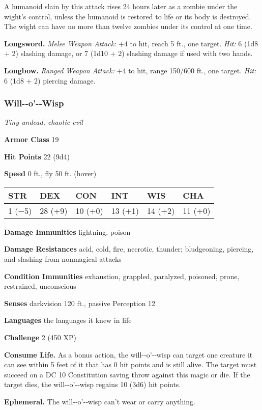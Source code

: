 \documentclass[
]{article}
\begin{document}
A humanoid slain by this attack rises 24 hours later as a zombie under
the wight's control, unless the humanoid is restored to life or its body
is destroyed. The wight can have no more than twelve zombies under its
control at one time.

\textbf{Longsword.} \emph{Melee Weapon Attack:} +4 to hit, reach 5 ft.,
one target. \emph{Hit:} 6 (1d8 + 2) slashing damage, or 7 (1d10 + 2)
slashing damage if used with two hands.

\textbf{Longbow.} \emph{Ranged Weapon Attack:} +4 to hit, range 150/600
ft., one target. \emph{Hit:} 6 (1d8 + 2) piercing damage.

\hypertarget{will-o-wisp}{%
\subsubsection{Will-­‐o'-­‐Wisp}\label{will-o-wisp}}

\emph{Tiny undead, chaotic evil}

\textbf{Armor Class} 19

\textbf{Hit Points} 22 (9d4)

\textbf{Speed} 0 ft., fly 50 ft. (hover)

\begin{longtable}[]{@{}llllll@{}}
\toprule
STR & DEX & CON & INT & WIS & CHA\tabularnewline
\midrule
\endhead
1 (−5) & 28 (+9) & 10 (+0) & 13 (+1) & 14 (+2) & 11 (+0)\tabularnewline
\bottomrule
\end{longtable}

\textbf{Damage Immunities} lightning, poison

\textbf{Damage Resistances} acid, cold, fire, necrotic, thunder;
bludgeoning, piercing, and slashing from nonmagical attacks

\textbf{Condition Immunities} exhaustion, grappled, paralyzed, poisoned,
prone, restrained, unconscious

\textbf{Senses} darkvision 120 ft., passive Perception 12

\textbf{Languages} the languages it knew in life

\textbf{Challenge} 2 (450 XP)

\textbf{Consume Life.} As a bonus action, the will-­‐o'-­‐wisp can
target one creature it can see within 5 feet of it that has 0 hit points
and is still alive. The target must succeed on a DC 10 Constitution
saving throw against this magic or die. If the target dies, the
will-­‐o'-­‐wisp regains 10 (3d6) hit points.

\textbf{Ephemeral.} The will-­‐o'-­‐wisp can't wear or carry anything.
\end{document}
